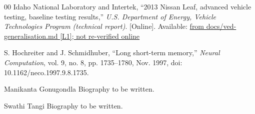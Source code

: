 \documentclass{ieeeaccess}
\begin{document}
\begin{thebibliography}{00}
 Idaho National Laboratory and Intertek, ``2013 Nissan Leaf, advanced vehicle testing, baseline testing results,'' \emph{U.S. Department of Energy, Vehicle Technologies Program (technical report)}. [Online]. Available: \url{from docs/ved-generalisation.md [L1]; not re-verified online}

 S. Hochreiter and J. Schmidhuber, ``Long short-term memory,'' \emph{Neural Computation}, vol. 9, no. 8, pp. 1735--1780, Nov. 1997, doi: 10.1162/neco.1997.9.8.1735.

\end{thebibliography}

\begin{IEEEbiographynophoto}{Manikanta Gonugondla}
Biography to be written.
\end{IEEEbiographynophoto}

\begin{IEEEbiographynophoto}{Swathi Tangi}
Biography to be written.
\end{IEEEbiographynophoto}

\EOD
\end{document}
